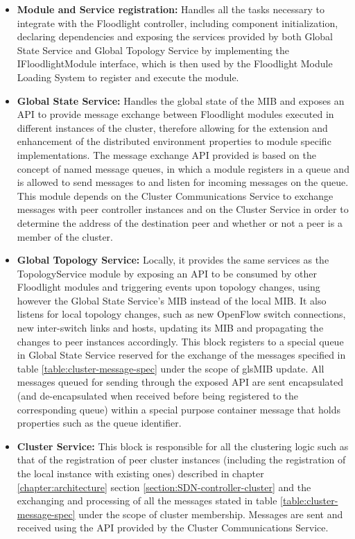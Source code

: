 \begin{itemize}
	\item \textbf{Module and Service registration:} Handles all the tasks necessary to integrate with the Floodlight controller, including component initialization, declaring dependencies and exposing the services provided by both Global State Service and Global Topology Service by implementing the IFloodlightModule interface, which is then used by the Floodlight Module Loading System to register and execute the module.
	\item \textbf{Global State Service:} Handles the global state of the \gls{MIB} and exposes an \gls{API} to provide message exchange between Floodlight modules executed in different instances of the cluster, therefore allowing for the extension and enhancement of the distributed environment properties to module specific implementations. The message exchange \gls{API} provided is based on the concept of named message queues, in which a module registers in a queue and is allowed to send messages to and listen for incoming messages on the queue. This module depends on the Cluster Communications Service to exchange messages with peer controller instances and on the Cluster Service in order to determine the address of the destination peer and whether or not a peer is a member of the cluster.
	\item \textbf{Global Topology Service:} Locally, it provides the same services as the TopologyService module by exposing an \gls{API} to be consumed by other Floodlight modules and triggering events upon topology changes, using however the Global State Service's \gls{MIB} instead of the local \gls{MIB}. It also listens for local topology changes, such as new OpenFlow switch connections, new inter-switch links and hosts, updating its \gls{MIB} and propagating the changes to peer instances accordingly. This block registers to a special queue in Global State Service reserved for the exchange of the messages specified in table \ref{table:cluster-message-spec} under the scope of gls{MIB} update. All messages queued for sending through the exposed \gls{API} are sent encapsulated (and de-encapsulated when received before being registered to the corresponding queue) within a special purpose container message that holds properties such as the queue identifier.
	\item \textbf{Cluster Service:} This block is responsible for all the clustering logic such as that of the registration of peer cluster instances (including the registration of the local instance with existing ones) described in chapter \ref*{chapter:architecture} section \ref{section:SDN-controller-cluster} and the exchanging and processing of all the messages stated in table \ref{table:cluster-message-spec} under the scope of cluster membership. Messages are sent and received using the \gls{API} provided by the Cluster Communications Service.

\end{itemize}
